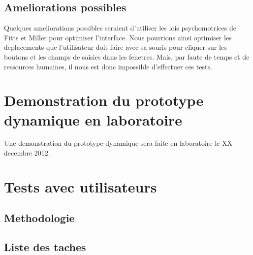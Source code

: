 \documentclass[letterpaper, oneside, 12pt, these, creativecommons]{thETS}
\begin{document}
\section{Ameliorations possibles}

Quelques ameliorations possibles seraient d'utiliser les lois psychomotrices de Fitts et Miller pour optimiser l'interface. Nous pourrions ainsi optimiser les deplacements que l'utilisateur doit faire avec sa souris pour cliquer sur les boutons et les champs de saisies dans les fenetres. Mais, par faute de temps et de ressources humaines, il nous est donc impossible d'effectuer ces tests.

\chapter{Demonstration du prototype dynamique en laboratoire}

Une demonstration du prototype dynamique sera faite en laboratoire le XX decembre 2012.

\chapter{Tests avec utilisateurs}

\section{Methodologie}

\newpage

\section{Liste des taches}
\end{document}

